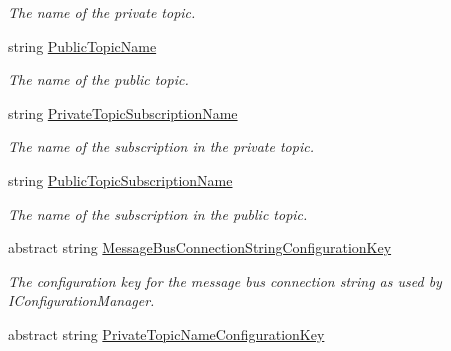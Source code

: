 \begin{DoxyCompactItemize}
\begin{DoxyCompactList}\small\item\em The name of the private topic. \end{DoxyCompactList}\item 
string \hyperlink{classCqrs_1_1Azure_1_1ServiceBus_1_1AzureServiceBus_ac6f4fbafebcde04a8493462b688e0abe_ac6f4fbafebcde04a8493462b688e0abe}{Public\+Topic\+Name}
\begin{DoxyCompactList}\small\item\em The name of the public topic. \end{DoxyCompactList}\item 
string \hyperlink{classCqrs_1_1Azure_1_1ServiceBus_1_1AzureServiceBus_a22498d51bba26c801b3b553fb451a6ae_a22498d51bba26c801b3b553fb451a6ae}{Private\+Topic\+Subscription\+Name}
\begin{DoxyCompactList}\small\item\em The name of the subscription in the private topic. \end{DoxyCompactList}\item 
string \hyperlink{classCqrs_1_1Azure_1_1ServiceBus_1_1AzureServiceBus_adab1b2f0dc9f199d5f0aa60d57ba71c8_adab1b2f0dc9f199d5f0aa60d57ba71c8}{Public\+Topic\+Subscription\+Name}
\begin{DoxyCompactList}\small\item\em The name of the subscription in the public topic. \end{DoxyCompactList}\item 
abstract string \hyperlink{classCqrs_1_1Azure_1_1ServiceBus_1_1AzureServiceBus_a2cde8078f7d4d9706dec5fb066359ee0_a2cde8078f7d4d9706dec5fb066359ee0}{Message\+Bus\+Connection\+String\+Configuration\+Key}
\begin{DoxyCompactList}\small\item\em The configuration key for the message bus connection string as used by I\+Configuration\+Manager. \end{DoxyCompactList}\item 
abstract string \hyperlink{classCqrs_1_1Azure_1_1ServiceBus_1_1AzureServiceBus_ad24cd58549bbf6377e692b6ae6843be9_ad24cd58549bbf6377e692b6ae6843be9}{Private\+Topic\+Name\+Configuration\+Key}

\end{DoxyCompactItemize}
